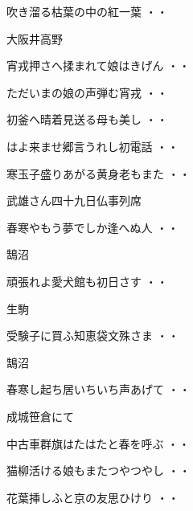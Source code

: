 \begin{shiika}吹き溜る枯葉の中の紅一葉
\hfill{・・}\end{shiika}
\vspace{0.6cm}
大阪井高野
\begin{shiika}宵戎押さへ揉まれて娘はきげん
\hfill{・・}\end{shiika}
\begin{shiika}ただいまの娘の声弾む宵戎
\hfill{・・}\end{shiika}
\begin{shiika}初釜へ晴着見送る母も美し
\hfill{・・}\end{shiika}
\begin{shiika}はよ来ませ郷言うれし初電話
\hfill{・・}\end{shiika}
\begin{shiika}寒玉子盛りあがる黄身老もまた
\hfill{・・}\end{shiika}
\vspace{0.6cm}
武雄さん四十九日仏事列席
\begin{shiika}春寒やもう夢でしか逢へぬ人
\hfill{・・}\end{shiika}
\vspace{0.6cm}
鵠沼
\begin{shiika}頑張れよ愛犬館も初日さす
\hfill{・・}\end{shiika}
\vspace{0.6cm}
生駒
\begin{shiika}受験子に買ふ知恵袋文殊さま
\hfill{・・}\end{shiika}
\vspace{0.6cm}
鵠沼
\begin{shiika}春寒し起ち居いちいち声あげて
\hfill{・・}\end{shiika}
\vspace{0.6cm}
成城笹倉にて
\begin{shiika}中古車群旗はたはたと春を呼ぶ
\hfill{・・}\end{shiika}
\begin{shiika}猫柳活ける娘もまたつやつやし
\hfill{・・}\end{shiika}
\begin{shiika}花葉挿しふと京の友思ひけり
\hfill{・・}\end{shiika}
